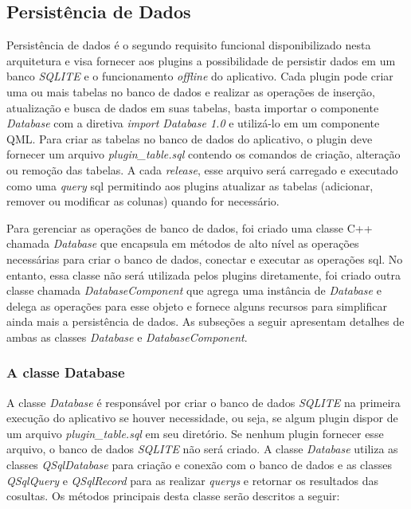 \subsection{Persistência de Dados}\label{sec:solucao-desenvolvida}
Persistência de dados é o segundo requisito funcional disponibilizado nesta arquitetura e visa fornecer aos plugins a possibilidade de persistir dados em um banco \textit{SQLITE} e o funcionamento \textit{offline} do aplicativo. Cada plugin pode criar uma ou mais tabelas no banco de dados e realizar as operações de inserção, atualização e busca de dados em suas tabelas, basta importar o componente \textit{Database} com a diretiva \textit{import Database 1.0} e utilizá-lo em um componente QML. Para criar as tabelas no banco de dados do aplicativo, o plugin deve fornecer um arquivo \textit{plugin\_table.sql} contendo os comandos de criação, alteração ou remoção das tabelas. A cada \textit{release}, esse arquivo será carregado e executado como uma \textit{query} sql permitindo aos plugins atualizar as tabelas (adicionar, remover ou modificar as colunas) quando for necessário.\par

Para gerenciar as operações de banco de dados, foi criado uma classe C++ chamada \textit{Database} que encapsula em métodos de alto nível as operações necessárias para criar o banco de dados, conectar e executar as operações sql. No entanto, essa classe não será utilizada pelos plugins diretamente, foi criado outra classe chamada \textit{DatabaseComponent} que agrega uma instância de \textit{Database} e delega as operações para esse objeto e fornece alguns recursos para simplificar ainda mais a persistência de dados. As subseções a seguir apresentam detalhes de ambas as classes \textit{Database} e \textit{DatabaseComponent}.

\subsubsection{A classe Database}\label{sec:solucao-desenvolvida}
A classe \textit{Database} é responsável por criar o banco de dados \textit{SQLITE} na primeira execução do aplicativo se houver necessidade, ou seja, se algum plugin dispor de um arquivo \textit{plugin\_table.sql} em seu diretório. Se nenhum plugin fornecer esse arquivo, o banco de dados \textit{SQLITE} não será criado. A classe \textit{Database} utiliza as classes \textit{QSqlDatabase} para criação e conexão com o banco de dados e as classes \textit{QSqlQuery} e \textit{QSqlRecord} para as realizar \textit{querys} e retornar os resultados das cosultas. Os métodos principais desta classe serão descritos a seguir:


